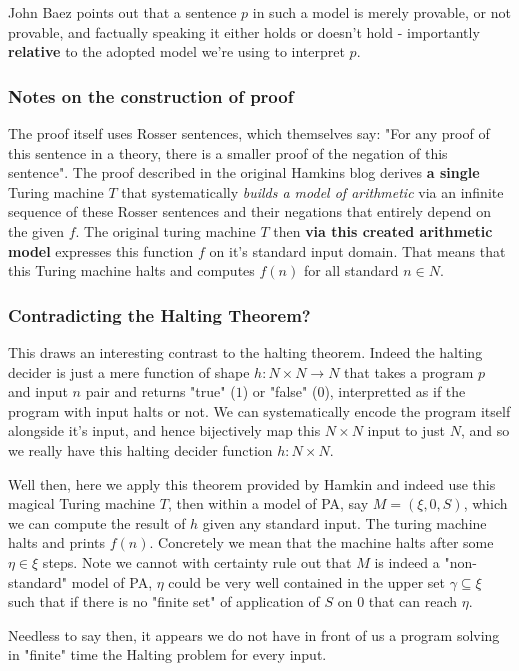 \documentclass{article}
\begin{document}
John Baez points out that a sentence $p$ in such a model is merely provable, or not provable, and factually speaking it either holds or doesn't hold - importantly \textbf{relative} to the adopted model we're using to interpret $p$.

\subsubsection{Notes on the construction of proof}
The proof itself uses Rosser sentences, which themselves say: "For any proof of this sentence in a theory, there is a smaller proof of the negation of this sentence". The proof described in the original Hamkins blog derives \textbf{a single} Turing machine $T$ that systematically \emph{builds a model of arithmetic} via an infinite sequence of these Rosser sentences and their negations that entirely depend on the given $f$. The original turing machine $T$ then \textbf{via this created arithmetic model} expresses this function $f$ on it's standard input domain. That means that this Turing machine halts and computes $f(n)$ for all standard $n \in N$.

\subsubsection{Contradicting the Halting Theorem?}
This draws an interesting contrast to the halting theorem. Indeed the halting decider is just a mere function of shape $h: N \times N \rightarrow N$ that takes a program $p$ and input $n$ pair and returns "true" ($1$) or "false" ($0$), interpretted as if the program with input halts or not. We can systematically encode the program itself alongside it's input, and hence bijectively map this $N \times N$ input to just $N$, and so we really have this halting decider function $h: N \times N$.

Well then, here we apply this theorem provided by Hamkin and indeed use this magical Turing machine $T$, then within a model of PA, say $M = (\xi,0,S)$, which we can compute the result of $h$ given any standard input. The turing machine halts and prints $f(n)$. Concretely we mean that the machine halts after some $\eta \in \xi$ steps. Note we cannot with certainty rule out that $M$ is indeed a "non-standard" model of PA, $\eta$ could be very well contained in the upper set $\gamma \subseteq \xi$ such that if there is no "finite set" of application of $S$ on $0$ that can reach $\eta$.

Needless to say then, it appears we do not have in front of us a program solving in "finite" time the Halting problem for every input.
\end{document}
